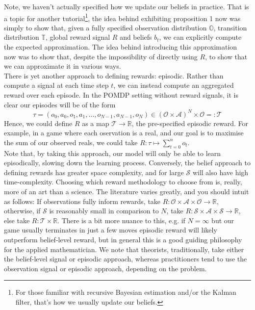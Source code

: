 \documentclass[12pt]{article}
\begin{document}
Note, we haven't actually specified how we update our beliefs in practice. That is a topic for another tutorial\footnote{
    For those familiar with recursive Bayesian estimation and/or the Kalman filter, that's how we usually update our beliefs.
}, the idea behind exhibiting proposition 1 now was simply to show that, given a fully specified observation distribution 
$\mathbb{O}$, transition distribution $\mathbb{T}$, global reward signal $R$ and beliefs $b_t$, we can explicitly compute the 
expected approximation. The idea behind introducing this approximation now was to show that, despite the impossibility of directly 
using $R$, to show that we can approximate it in various ways. \\ 

There is yet another approach to defining rewards: episodic. Rather than compute a signal at each time step $t$, we can instead 
compute an aggregated reward over each episode. In the POMDP setting without reward signals, it is clear our episodes will be 
of the form 
$$\tau = (o_0, a_0, o_1, a_1, \dots, o_{N-1}, a_{N-1}, o_N) \in (\mathcal{O} \times \mathcal{A})^N \times \mathcal{O} =: \mathcal{T}$$
Hence, we could define $R$ as a map $\mathcal{T} \to \mathbb{R}$, the pre-specified episodic reward. For example, in a game where 
each oservation is a real, and our goal is to maximise the sum of our observed reals, we could take $R: \tau \mapsto \sum_{t=0}^n o_t$. \\ 

Note that, by taking this approach, our model will only be able to learn episodically, slowing down the learning process. Conversely, 
the belief approach to defining rewards has greater space complexity, and for large $\mathcal{S}$ will also have high time-complexity. 
Choosing which reward methodology to choose from is, really, more of an art than a science. The literature varies greatly, and you 
should intuit as follows: If observations fully inform rewards, take $R: \mathcal{O} \times \mathcal{A} \times \mathcal{O} \to 
\mathbb{R}$, otherwise, if $\mathcal{S}$ is reasonably small in comparison to $N$, take $R: \mathcal{S} \times \mathcal{A} 
\times \mathcal{S} \to \mathbb{R}$, else take $R: \mathcal{T} \times \mathbb{R}$. There is a bit more nuance to this, e.g. if 
$N = \infty$ but our game usually terminates in just a few moves episodic reward will likely outperform belief-level reward, 
but in general this is a good guiding philosophy for the applied mathematician. We note that theorists, traditionally, take 
either the belief-level signal or episodic approach, whereas practitioners tend to use the observation signal or episodic approach, 
depending on the problem. \\ 
\end{document}
